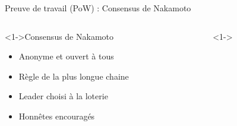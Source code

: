 \documentclass[presentation]{beamer}
\begin{document}
\begin{frame}[label={sec:orgf49b2d8}]{Preuve de travail (PoW) : Consensus de Nakamoto}


\begin{columns}
\begin{column}{0.50\columnwidth}
\begin{block}<1->{Consensus de Nakamoto}
\begin{itemize}
\item Anonyme et ouvert à tous
\item Règle de la plus longue chaine
\item Leader choisi à la loterie
\item Honnêtes encouragés
\end{itemize}
\end{block}
\end{column}
\begin{column}{0.50\columnwidth}
\begin{block}<1->{}
\end{block}
\end{column}
\end{columns}
\end{frame}
\end{document}

